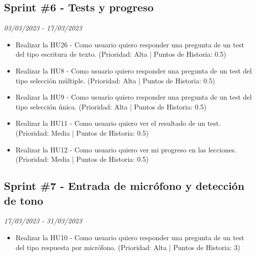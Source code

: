 \subsection{Sprint \#6 - Tests y progreso}
\textit{03/03/2023   -   17/03/2023}
\begin{itemize}
    \item Realizar la HU26 - Como usuario quiero responder una pregunta de un test del tipo escritura de texto. (Prioridad: Alta | Puntos de Historia: 0.5)
    \item Realizar la HU8 - Como usuario quiero responder una pregunta de un test del tipo selección múltiple. (Prioridad: Alta | Puntos de Historia: 0.5)
    \item Realizar la HU9 - Como usuario quiero responder una pregunta de un test del tipo selección única. (Prioridad: Alta | Puntos de Historia: 0.5)
    \item Realizar la HU11 - Como usuario quiero ver el resultado de un test. (Prioridad: Media | Puntos de Historia: 0.5)
    \item Realizar la HU12 - Como usuario quiero ver mi progreso en las lecciones. (Prioridad: Media | Puntos de Historia: 0.5)

\end{itemize}

\subsection{Sprint \#7 - Entrada de micrófono y detección de tono}
\textit{17/03/2023   -   31/03/2023}
\begin{itemize}
    \item Realizar la HU10 - Como usuario quiero responder una pregunta de un test del tipo respuesta por micrófono. (Prioridad: Alta | Puntos de Historia: 3)
\end{itemize}

